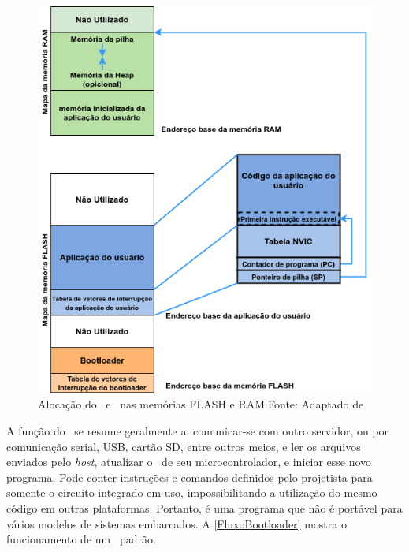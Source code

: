 \begin{figure}[H]
    \scriptsize
     \centering
     \includegraphics[scale=0.7]{dados/figuras/DiagBootloaderOriginal.png}
     \caption{Alocação do \bootloader\ e \firmware\ nas memórias FLASH e RAM.\newline Fonte: Adaptado de \cite{DavesDurlin2013}}
     \label{Diag_Bootloader}
\end{figure}

A função do \bootloader\ se resume geralmente a: comunicar-se com outro servidor, ou por comunicação serial, USB, cartão SD, entre outros meios, e ler os arquivos enviados pelo \textit{host}, atualizar o \firmware\ de seu microcontrolador, e iniciar esse novo programa. 
Pode conter instruções e comandos definidos pelo projetista para somente o circuito integrado em uso, impossibilitando a utilização do mesmo código em outras plataformas.
Portanto, é uma programa que não é portável para vários modelos de sistemas embarcados. A \autoref{FluxoBootloader} mostra o funcionamento de um \bootloader\ padrão. 

